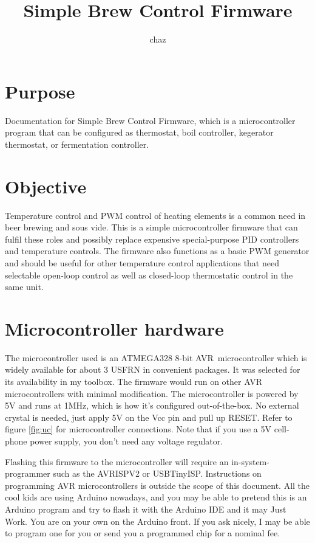 \documentclass[dvips,12pt]{article}
\title{Simple Brew Control Firmware}
\author{chaz}
\begin{document}
\frenchspacing


\section{Purpose}
Documentation for Simple Brew Control Firmware, which is a microcontroller program that can be configured as thermostat, boil
controller, kegerator thermostat, or fermentation controller. 

\tableofcontents
\listoffigures

\section{Objective}

Temperature control and PWM control of heating elements is a common need in beer brewing and sous vide. This is a simple
microcontroller firmware that can fulfil these roles and possibly replace expensive special-purpose PID controllers and temperature controls. The firmware also functions as a basic PWM generator and should be useful for other temperature control applications that need selectable open-loop control as well as closed-loop thermostatic control in the same unit. 

\section{Microcontroller hardware}

The microcontroller used is an ATMEGA328 8-bit AVR\textcopyright\ microcontroller which is widely available for about 3
USFRN in convenient packages. It was selected for its availability in my toolbox. The firmware would run on other AVR
microcontrollers with minimal modification. The microcontroller is powered by 5V and runs at 1MHz, which is how it's
configured out-of-the-box.  No external crystal is needed, just apply 5V on the Vcc pin and pull up RESET. Refer to
figure \ref{fig:uc} for microcontroller connections. Note that if you use a 5V cell-phone power supply, you don't need
any voltage regulator.

Flashing this firmware to the microcontroller will require an in-system-programmer such as the AVRISPV2 or USBTinyISP.
Instructions on programming AVR microcontrollers is outside the scope of this document. All the cool kids are using
Arduino nowadays, and you may be able to pretend this is an Arduino program and try to flash it with the Arduino IDE and
it may Just Work. You are on your own on the Arduino front. If you ask nicely, I may be able to program one for you or
send you a programmed chip for a nominal fee.
\end{document}

